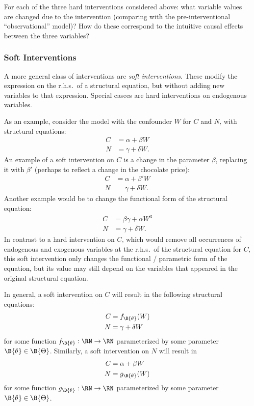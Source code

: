 \begin{Exc}
  For each of the three hard interventions considered above: what variable values are changed due to the intervention (comparing with the pre-interventional ``observational'' model)? 
  How do these correspond to the intuitive causal effects between the three variables?
\end{Exc}

\subsubsection{Soft Interventions}

A more general class of interventions are \emph{soft interventions}. These modify 
the expression on the r.h.s.\ of a structural equation, but without adding new variables
to that expression. Special casees are hard interventions on endogenous variables.

As an example, consider the model with the confounder $W$ for $C$ and $N$, with 
structural equations:
    \begin{align*}
      C &= \alpha + \beta W \\
      N &= \gamma + \delta W.
    \end{align*}
An example of a soft intervention on $C$ is a change in the parameter $\beta$, replacing it
with $\beta'$ (perhaps to reflect a change in the chocolate price):
    \begin{align*}
      C &= \alpha + \beta' W \\
      N &= \gamma + \delta W.
    \end{align*}
Another example would be to change the functional form of the structural equation:
    \begin{align*}
      C &= \beta\gamma + \alpha W^3 \\
      N &= \gamma + \delta W.
    \end{align*}
In contrast to a hard intervention on $C$, which would remove all occurrences of 
endogenous and exogenous variables at the r.h.s.\ of the structural equation for $C$,
this soft intervention only changes the functional / parametric form of the equation,
but its value may still depend on the variables that appeared in the original 
structural equation.

In general, a soft intervention on $C$ will result in the following structural equations:
    \begin{align*}
      C &= f_{\B{\theta}}(W) \\
      N &= \gamma + \delta W
    \end{align*}
for some function $f_{\B{\theta}} : \RN \to \RN$ parameterized by some parameter $\B{\theta} \in \B{\Theta}$.
Similarly, a soft intervention on $N$ will result in
    \begin{align*}
      C &= \alpha + \beta W \\
      N &= g_{\B{\theta}}(W)
    \end{align*}
for some function $g_{\B{\theta}} : \RN \to \RN$ parameterized by some parameter $\B{\theta} \in \B{\Theta}$.

